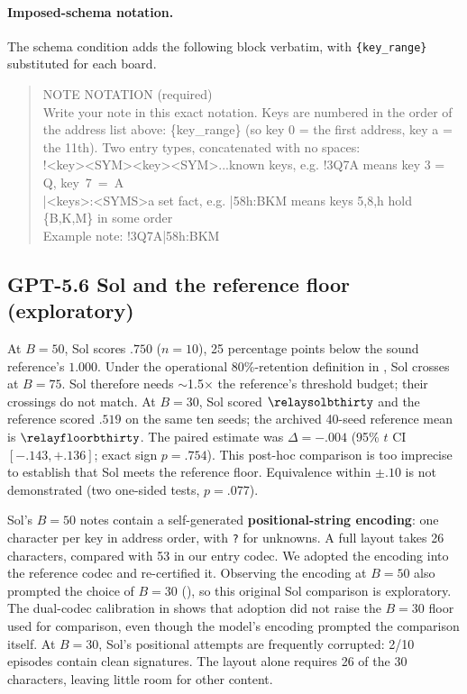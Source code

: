 \noindent\begin{minipage}{\linewidth}
\paragraph{Imposed-schema notation.}
The schema condition adds the following block verbatim, with \texttt{\{key\_range\}} substituted for each board.
\begin{quote}\small\ttfamily
NOTE NOTATION (required)\\
Write your note in this exact notation. Keys are numbered in the order of the address list above: \{key\_range\} (so key 0 = the first address, key a = the 11th). Two entry types, concatenated with no spaces:\\
\hspace*{1em}!<key><SYM><key><SYM>...\hspace{2em}known keys, e.g. !3Q7A means key 3 = Q, \mbox{key 7 = A}\\
\hspace*{1em}|<keys>:<SYMS>\hspace{5.5em}a set fact, e.g. |58h:BKM means keys 5,8,h hold \{B,K,M\} in some order\\
Example note: !3Q7A|58h:BKM
\end{quote}
\end{minipage}

\subsection{GPT-5.6 Sol and the reference floor (exploratory)}\label{sec:b30}
At $B{=}50$, Sol scores $.750$ ($n{=}10$), 25 percentage points below the sound reference's $1.000$. Under the operational 80\%-retention definition in , Sol crosses at $B{=}75$. Sol therefore needs $\sim$1.5$\times$ the reference's threshold budget; their crossings do not match. At $B{=}30$, Sol scored $\relaysolbthirty$ and the reference scored $.519$ on the same ten seeds; the archived 40-seed reference mean is $\relayfloorbthirty$. The paired estimate was $\Delta{=}{-}.004$ (95\% $t$ CI $[-.143,+.136]$; exact sign $p{=}.754$). This post-hoc comparison is too imprecise to establish that Sol meets the reference floor. Equivalence within $\pm.10$ is not demonstrated (two one-sided tests, $p{=}.077$).

Sol's $B{=}50$ notes contain a self-generated \textbf{positional-string encoding}: one character per key in address order, with \texttt{?} for unknowns. A full layout takes 26 characters, compared with 53 in our entry codec. We adopted the encoding into the reference codec and re-certified it. Observing the encoding at $B{=}50$ also prompted the choice of $B{=}30$ (), so this original Sol comparison is exploratory. The dual-codec calibration in  shows that adoption did not raise the $B{=}30$ floor used for comparison, even though the model's encoding prompted the comparison itself. At $B{=}30$, Sol's positional attempts are frequently corrupted: 2/10 episodes contain clean signatures. The layout alone requires 26 of the 30 characters, leaving little room for other content.

